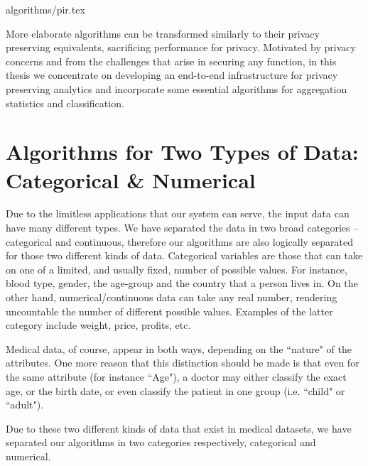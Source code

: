 {algorithms/pir.tex}


More elaborate algorithms can be transformed similarly to their privacy preserving equivalents, sacrificing performance for privacy.
Motivated by privacy concerns and from the challenges that arise in securing any function, in this thesis we concentrate on developing an end-to-end infrastructure for privacy preserving analytics and incorporate some essential algorithms for aggregation statistics and classification.




\section{Algorithms for Two Types of Data: Categorical \& Numerical}\label{s:two-types-of-data}
Due to the limitless applications that our system can serve, the input data can have many different types.
We have separated the data in two broad categories -- categorical and continuous, therefore our algorithms are also logically separated for those two different kinds of data.
Categorical variables are those that can take on one of a limited, and usually fixed, number of possible values.
For instance, blood type, gender, the age-group and the country that a person lives in.
On the other hand, numerical/continuous data can take any real number, rendering uncountable the number of different possible values.
Examples of the latter category include weight, price, profits, etc.

Medical data, of course, appear in both ways, depending on the ``nature" of the attributes.
One more reason that this distinction should be made is that even for the same attribute (for instance ``Age"), a doctor may either classify the exact age, or the birth date, or even classify the patient in one group (i.e. ``child" or ``adult").

Due to these two different kinds of data that exist in medical datasets, we have separated our algorithms in two categories respectively, categorical and numerical.





